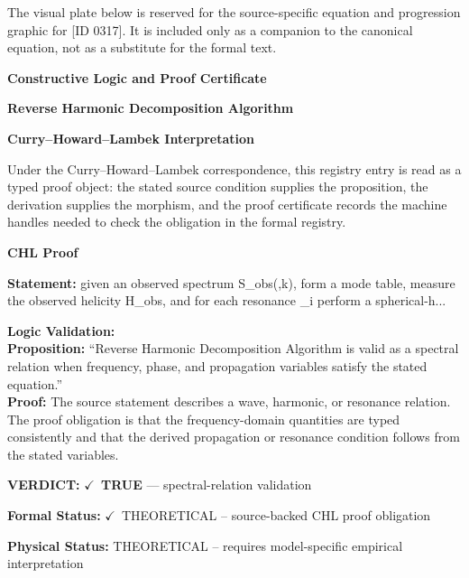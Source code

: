 \begingroup\footnotesize\sloppy
The visual plate below is reserved for the source-specific equation and progression graphic for [ID 0317]. It is included only as a companion to the canonical equation, not as a substitute for the formal text.
\par\endgroup
\ifTZPDarkEdition
{}
\fi

\clearpage
\begingroup\tzpsupportsetup
\noindent\textbf{\fontsize{10.8pt}{12.8pt}\selectfont [ID 0317] Constructive Logic and Proof Certificate}\par
\noindent\textbf{\fontsize{10pt}{12pt}\selectfont Reverse Harmonic Decomposition Algorithm}\par
\vspace{0.45em}
\begingroup
\footnotesize
\setlength{\parskip}{0.22em}
\setlength{\parindent}{0pt}
\noindent\textbf{Curry--Howard--Lambek Interpretation}\par
Under the Curry--Howard--Lambek correspondence, this registry entry is read as a typed proof
object: the stated source condition supplies the proposition, the derivation supplies the
morphism, and the proof certificate records the machine handles needed to check the obligation
in the formal registry.

\vspace{0.45em}
\noindent\textbf{CHL Proof}\par
\textbf{Statement:} given an observed spectrum S\_obs(,k), form a mode table, measure the observed helicity
H\_obs, and for each resonance \_i perform a spherical-h...

\textbf{Logic Validation:}\\
\textbf{Proposition:} ``Reverse Harmonic Decomposition Algorithm is valid as a spectral relation when frequency,
phase, and propagation variables satisfy the stated equation.''\\
\textbf{Proof:} The source statement describes a wave, harmonic, or resonance relation. The proof
obligation is that the frequency-domain quantities are typed consistently and that the
derived propagation or resonance condition follows from the stated variables.

\textbf{VERDICT:} \ensuremath{\checkmark}\ \textbf{TRUE} --- spectral-relation validation

\textbf{Formal Status:} \ensuremath{\checkmark}\ THEORETICAL -- source-backed CHL proof obligation

\textbf{Physical Status:} THEORETICAL -- requires model-specific empirical interpretation
\par\vspace{0.45em}
\par
\ifTZPDarkEdition
{}
\fi
\endgroup
\endgroup
